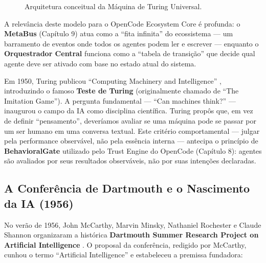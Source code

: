 \begin{figure}[htbp]
\centering
{}
\caption{Arquitetura conceitual da Máquina de Turing Universal.}
\label{fig:turing_machine}
\end{figure}

A relevância deste modelo para o OpenCode Ecosystem Core é profunda: o \textbf{MetaBus} (Capítulo 9) atua como a ``fita infinita'' do ecossistema --- um barramento de eventos onde todos os agentes podem ler e escrever --- enquanto o \textbf{Orquestrador Central} funciona como a ``tabela de transição'' que decide qual agente deve ser ativado com base no estado atual do sistema.

Em 1950, Turing publicou ``Computing Machinery and Intelligence'' \cite{turing1950computing}, introduzindo o famoso \textbf{Teste de Turing} (originalmente chamado de ``The Imitation Game''). A pergunta fundamental --- ``Can machines think?'' --- inaugurou o campo da IA como disciplina científica. Turing propôs que, em vez de definir ``pensamento'', deveríamos avaliar se uma máquina pode se passar por um ser humano em uma conversa textual. Este critério comportamental --- julgar pela performance observável, não pela essência interna --- antecipa o princípio de \textbf{BehavioralGate} utilizado pelo Trust Engine do OpenCode (Capítulo 8): agentes são avaliados por seus resultados observáveis, não por suas intenções declaradas.

\subsection{A Conferência de Dartmouth e o Nascimento da IA (1956)}

No verão de 1956, John McCarthy, Marvin Minsky, Nathaniel Rochester e Claude Shannon organizaram a histórica \textbf{Dartmouth Summer Research Project on Artificial Intelligence} \cite{mccarthy1956dartmouth}. O proposal da conferência, redigido por McCarthy, cunhou o termo ``Artificial Intelligence'' e estabeleceu a premissa fundadora:

